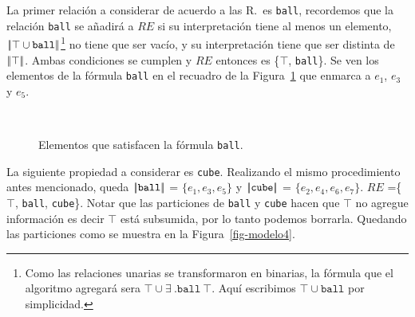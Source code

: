 La primer relaci\'on a considerar de acuerdo a las R.\puse\ es \texttt{ball}, recordemos que la relaci\'on \texttt{ball} se a\~nadir\'a a $RE$ si su interpretaci\'on 
tiene al menos un elemento, $|\!|\top \cup \texttt{ball}|\!|$\footnote{Como las relaciones unarias se transformaron en binarias, la f\'ormula que el algoritmo agregar\'a sera $\top \cup \exists\ .\texttt{ball}~\top$. Aqu\'i escribimos $\top \cup \texttt{ball}$ por simplicidad.} no tiene que ser vac\'io, y su interpretaci\'on tiene que ser distinta de $|\!|\top|\!|$. Ambas condiciones se cumplen y $RE$ entonces es \{$\top$, \texttt{ball}\}. Se ven los elementos de la f\'ormula \texttt{ball} en el recuadro de la Figura~\ref{fig-modelo3} que enmarca a $e_1$, $e_3$ y $e_5$.

\begin{figure}[ht]
\begin{center}
\\[0pt]
\caption{Elementos que satisfacen la f\'ormula \texttt{ball}.}
\label{fig-modelo3}
\end{center}
\end{figure}

La siguiente propiedad a considerar es \texttt{cube}. Realizando el mismo procedimiento antes mencionado, queda $|\!|\texttt{ball}|\!|$ = $\{e_1,e_3,e_5\}$ y
$|\!|\texttt{cube}|\!|$ = $\{e_2, e_4, e_6, e_7\}$. $RE$ =\{$\top$, \texttt{ball}, \texttt{cube}\}. Notar que las particiones de  \texttt{ball} y \texttt{cube} hacen que $\top$ no agregue informaci\'on es decir $\top$ est\'a subsumida, por lo tanto podemos borrarla. Quedando las particiones como se muestra en la Figura~\ref{fig-modelo4}.

%

